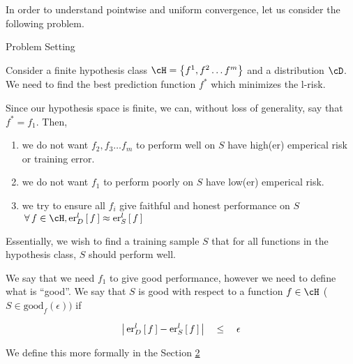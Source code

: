 \documentclass{article}
\begin{document}
\makeheader%

In order to understand pointwise and uniform convergence, let us consider the following problem. \br

\begin{ssection}[1]{Problem Setting}

	Consider a finite hypothesis class $\cH = \set{f^1, f^2 \dots f^m}$ and a distribution $\cD$. We need to find the best prediction function $f^\ast$ which minimizes the l-risk.

	Since our hypothesis space is finite, we can, without loss of generality, say that $f^\ast = f_1$. Then,

	\begin{enumerate}[label=(\roman*)]
		\item we do not want $f_2, f_3 \dots f_m$ to perform well on $S$ \ie have high(er) emperical risk or training error.
		\item we do not want $f_1$ to perform poorly on $S$ \ie have low(er) emperical risk.
		\item we try to ensure all $f_i$ give faithful and honest performance on $S$ \ie $\qforall f \in \cH, \err[_D^l]{f} \approx \err[_S^l]{f}$
	\end{enumerate}

	Essentially, we wish to find a training sample $S$ that for all functions in the hypothesis class, $S$ should perform well.

	We say that we need $f_1$ to give good performance, however we need to define what is ``good''. We say that $S$ is good with respect to a function $f \in \cH$ ($S \in \text{good}_f(\epsilon))$ if

	\begin{align*}
		\abs{\err[_D^l]{f} - \err[_S^l]{f}}	\qle	\epsilon
	\end{align*} \sbr

	We define this more formally in the Section \hyperlink{sec:2}{2}


\end{ssection}
\end{document}
